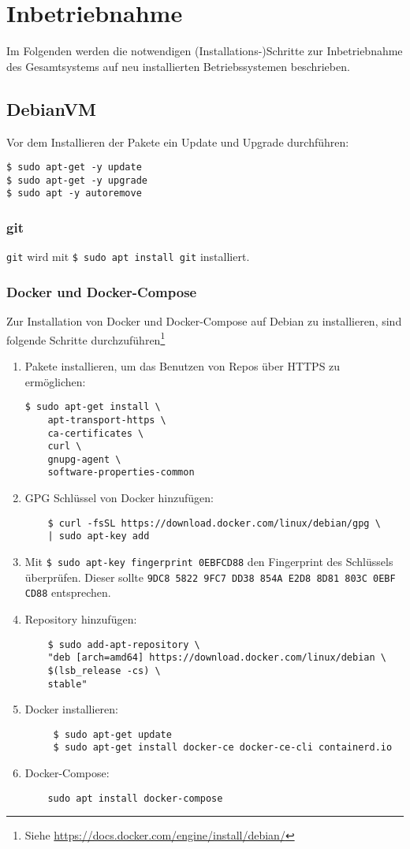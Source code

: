 \chapter{Inbetriebnahme}
Im Folgenden werden die notwendigen (Installations-)Schritte zur Inbetriebnahme des Gesamtsystems auf neu installierten Betriebssystemen beschrieben.
\section{DebianVM}
Vor dem Installieren der Pakete ein Update und Upgrade durchführen:
\begin{verbatim}
$ sudo apt-get -y update 
$ sudo apt-get -y upgrade
$ sudo apt -y autoremove
\end{verbatim}

\subsection{git}
\texttt{git} wird mit \verb|$ sudo apt install git| installiert.

\subsection{Docker und Docker-Compose}
Zur Installation von Docker und Docker-Compose auf Debian zu installieren, sind folgende Schritte durchzuführen\footnote{Siehe \href{https://docs.docker.com/engine/install/debian/}{https://docs.docker.com/engine/install/debian/}}
\begin{enumerate}
	\item Pakete installieren, um das Benutzen von Repos über HTTPS zu ermöglichen: 
	\begin{verbatim}
$ sudo apt-get install \
    apt-transport-https \
    ca-certificates \
    curl \
    gnupg-agent \
    software-properties-common
\end{verbatim}
	\item GPG Schlüssel von Docker hinzufügen:
	\begin{verbatim}
	$ curl -fsSL https://download.docker.com/linux/debian/gpg \
	| sudo apt-key add 
	\end{verbatim}
	\item Mit \verb|$ sudo apt-key fingerprint 0EBFCD88| den Fingerprint des Schlüssels überprüfen. Dieser sollte \texttt{9DC8 5822 9FC7 DD38 854A E2D8 8D81 803C 0EBF CD88} entsprechen.
	\item Repository hinzufügen:
	\begin{verbatim}
	$ sudo add-apt-repository \
	"deb [arch=amd64] https://download.docker.com/linux/debian \
	$(lsb_release -cs) \
	stable"
	\end{verbatim}
	\item Docker installieren:
	\begin{verbatim}
	 $ sudo apt-get update
	 $ sudo apt-get install docker-ce docker-ce-cli containerd.io
	\end{verbatim}
	\item Docker-Compose:
	\begin{verbatim}
	sudo apt install docker-compose
	\end{verbatim}
\end{enumerate}


